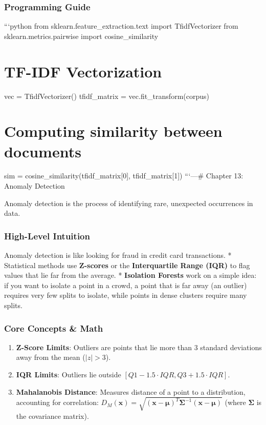 \subsubsection{Programming Guide}\label{programming-guide-11}

```python from sklearn.feature\_extraction.text import TfidfVectorizer
from sklearn.metrics.pairwise import cosine\_similarity

\section{TF-IDF Vectorization}\label{tf-idf-vectorization}

vec = TfidfVectorizer() tfidf\_matrix = vec.fit\_transform(corpus)

\section{Computing similarity between
documents}\label{computing-similarity-between-documents}

sim = cosine\_similarity(tfidf\_matrix{[}0{]}, tfidf\_matrix{[}1{]})
```\n\n---\n\n\# Chapter 13: Anomaly Detection

Anomaly detection is the process of identifying rare, unexpected
occurrences in data.

\subsubsection{High-Level Intuition}\label{high-level-intuition-12}

Anomaly detection is like looking for fraud in credit card transactions.
* Statistical methods use \textbf{Z-scores} or the \textbf{Interquartile
Range (IQR)} to flag values that lie far from the average. *
\textbf{Isolation Forests} work on a simple idea: if you want to isolate
a point in a crowd, a point that is far away (an outlier) requires very
few splits to isolate, while points in dense clusters require many
splits.

\subsubsection{Core Concepts \& Math}\label{core-concepts-math-1}

\begin{enumerate}
\def\labelenumi{\arabic{enumi}.}
\tightlist
\item
  \textbf{Z-Score Limits}: Outliers are points that lie more than 3
  standard deviations away from the mean (\(|z| > 3\)).
\item
  \textbf{IQR Limits}: Outliers lie outside
  \([Q1 - 1.5 \cdot IQR, Q3 + 1.5 \cdot IQR]\).
\item
  \textbf{Mahalanobis Distance}: Measures distance of a point to a
  distribution, accounting for correlation:
  \(D_M(\mathbf{x}) = \sqrt{(\mathbf{x} - \boldsymbol{\mu})^T \boldsymbol{\Sigma}^{-1} (\mathbf{x} - \boldsymbol{\mu})}\)
  (where \(\boldsymbol{\Sigma}\) is the covariance matrix).
\end{enumerate}

